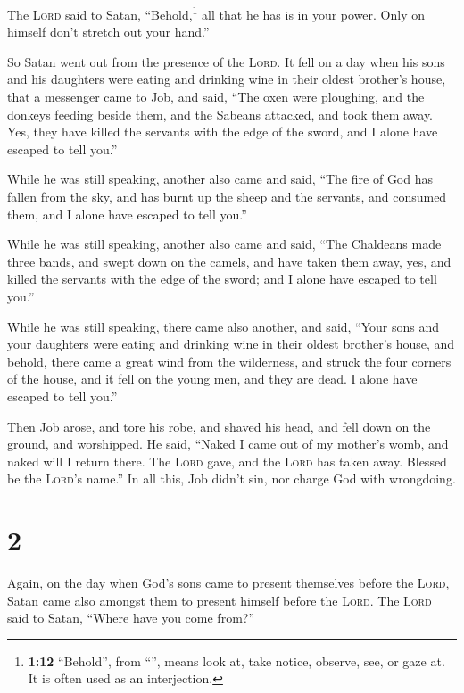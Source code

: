  The \textsc{Lord} said to Satan, ``Behold,\footnote{\textbf{1:12}
  ``Behold'', from ``'', means look at, take notice,
  observe, see, or gaze at. It is often used as an interjection.} all
that he has is in your power. Only on himself don't stretch out your
hand.''

So Satan went out from the presence of the \textsc{Lord}.
 It fell on a day when his sons and his daughters were
eating and drinking wine in their oldest brother's house,
 that a messenger came to Job, and said, ``The oxen were
ploughing, and the donkeys feeding beside them,  and the
Sabeans attacked, and took them away. Yes, they have killed the servants
with the edge of the sword, and I alone have escaped to tell you.''

 While he was still speaking, another also came and said,
``The fire of God has fallen from the sky, and has burnt up the sheep
and the servants, and consumed them, and I alone have escaped to tell
you.''

 While he was still speaking, another also came and said,
``The Chaldeans made three bands, and swept down on the camels, and have
taken them away, yes, and killed the servants with the edge of the
sword; and I alone have escaped to tell you.''

 While he was still speaking, there came also another,
and said, ``Your sons and your daughters were eating and drinking wine
in their oldest brother's house,  and behold, there came
a great wind from the wilderness, and struck the four corners of the
house, and it fell on the young men, and they are dead. I alone have
escaped to tell you.''

 Then Job arose, and tore his robe, and shaved his head,
and fell down on the ground, and worshipped.  He said,
``Naked I came out of my mother's womb, and naked will I return there.
The \textsc{Lord} gave, and the \textsc{Lord} has taken away. Blessed be
the \textsc{Lord}'s name.''  In all this, Job didn't sin,
nor charge God with wrongdoing.

\hypertarget{section-1}{%
\section{2}\label{section-1}}

 Again, on the day when God's sons came to present
themselves before the \textsc{Lord}, Satan came also amongst them to
present himself before the \textsc{Lord}.  The
\textsc{Lord} said to Satan, ``Where have you come from?''

